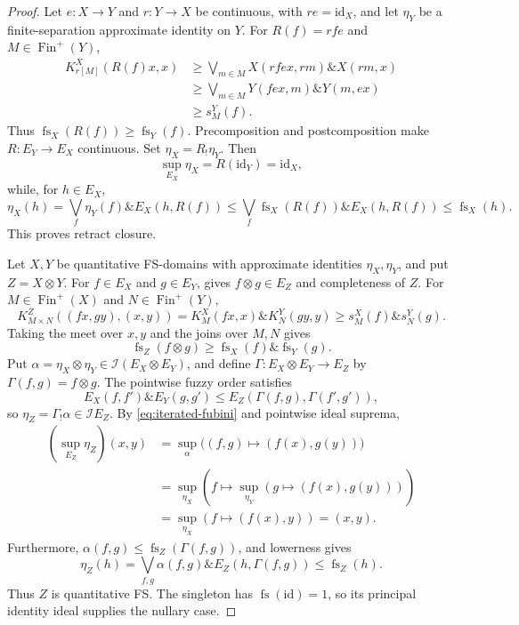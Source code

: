 \documentclass[preprint,3p,times]{elsarticle}
\theoremstyle{definition}
\theoremstyle{remark}
\newcommand{\I}{\mathcal{I}}
\newcommand{\id}{\mathrm{id}}
\newcommand{\supop}{\operatorname{sup}}
\newcommand{\fs}{\operatorname{fs}}
\newcommand{\Finp}{\operatorname{Fin}^{+}}
\newcommand{\tn}{\mathbin{\&}}
\numberwithin{equation}{section}
\begin{document}
\begin{proof}
Let \(e\colon X\to Y\) and \(r\colon Y\to X\) be continuous, with
\(re=\id_X\), and let \(\eta_Y\) be a finite-separation approximate
identity on \(Y\). For \(R(f)=rfe\) and \(M\in\Finp(Y)\),
\begin{align*}
 K^X_{r[M]}(R(f)x,x)
 &\geq\bigvee_{m\in M}X(rfex,rm)\tn X(rm,x)\\
 &\geq\bigvee_{m\in M}Y(fex,m)\tn Y(m,ex) \\
 &\geq s^Y_M(f).
\end{align*}
Thus \(\fs_X(R(f))\geq\fs_Y(f)\). Precomposition and postcomposition
make \(R\colon E_Y\to E_X\) continuous. Set \(\eta_X=R_!\eta_Y\).
Then
\[
 \supop_{E_X}\eta_X=R(\id_Y)=\id_X,
\]
while, for \(h\in E_X\),
\[
 \eta_X(h)=\bigvee_f\eta_Y(f)\tn E_X(h,R(f))
 \leq\bigvee_f\fs_X(R(f))\tn E_X(h,R(f))\leq\fs_X(h).
\]
This proves retract closure.

Let \(X,Y\) be quantitative FS-domains with approximate identities
\(\eta_X,\eta_Y\), and put \(Z=X\otimes Y\).
For \(f\in E_X\) and \(g\in E_Y\),  gives
\(f\otimes g\in E_Z\) and completeness of \(Z\).
For \(M\in\Finp(X)\) and \(N\in\Finp(Y)\),
\[
 K^Z_{M\times N}((fx,gy),(x,y))
 =K^X_M(fx,x)\tn K^Y_N(gy,y)
 \geq s^X_M(f)\tn s^Y_N(g).
\]
Taking the meet over \(x,y\) and the joins over \(M,N\) gives
\begin{equation}\label{eq:real-tensor-fs-bound}
 \fs_Z(f\otimes g)\geq\fs_X(f)\tn\fs_Y(g).
\end{equation}
Put \(\alpha=\eta_X\otimes\eta_Y\in\I(E_X\otimes E_Y)\), and define
\(\Gamma\colon E_X\otimes E_Y\to E_Z\) by \(\Gamma(f,g)=f\otimes g\). The pointwise fuzzy order satisfies
\[
 E_X(f,f')\tn E_Y(g,g')
 \leq E_Z(\Gamma(f,g),\Gamma(f',g')),
\]
so \(\eta_Z=\Gamma_!\alpha\in\I E_Z\). By \eqref{eq:iterated-fubini} and pointwise ideal suprema,
\begin{align*}
 (\supop_{E_Z}\eta_Z)(x,y)
 &=\supop_\alpha\bigl((f,g)\mapsto(f(x),g(y))\bigr)\\
 &=\supop_{\eta_X}\left(f\mapsto\supop_{\eta_Y}(g\mapsto(f(x),g(y)))\right)\\
 &=\supop_{\eta_X}(f\mapsto(f(x),y))=(x,y).
\end{align*}
Furthermore, \(\alpha(f,g)\leq\fs_Z(\Gamma(f,g))\), and lowerness gives
\[
 \eta_Z(h)=\bigvee_{f,g}\alpha(f,g)\tn E_Z(h,\Gamma(f,g))\leq\fs_Z(h).
\]
Thus \(Z\) is quantitative FS. The singleton has
\(\fs(\id)=1\), so its principal identity ideal supplies the nullary case.
\end{proof}
\end{document}
